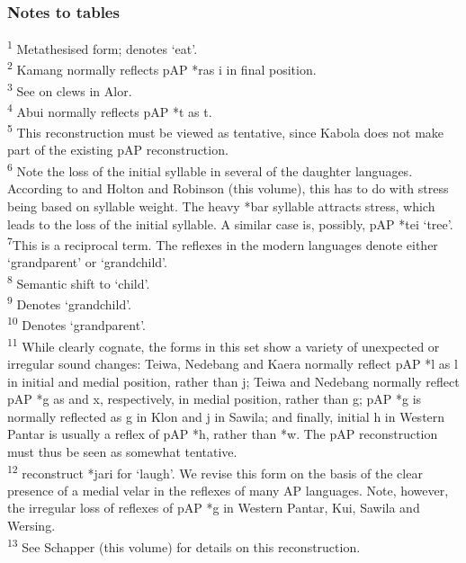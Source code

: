 \documentclass[output=paper]{LSP/langsci}
\begin{document}
\subsubsection{Notes to tables}
\noindent
\textsuperscript{1} Metathesised form; denotes ‘eat’. 
\\
\textsuperscript{2} Kamang normally reflects pAP *ras i in final position. 
\\
\textsuperscript{3} See \citet{Rodemeier1992} on clews in Alor. 
\\
\textsuperscript{4} Abui normally reflects pAP *t as t. 
\\
\textsuperscript{5} This reconstruction must be viewed as tentative, since Kabola does not make part of the existing pAP reconstruction.
\\
\textsuperscript{6} Note the loss of the initial syllable in several of the daughter languages. According to \citet{HoltonEtAl2012} and Holton and Robinson (this volume), this has to do with stress being based on syllable weight. The heavy *bar syllable attracts stress, which leads to the loss of the initial syllable. A similar case is, possibly, pAP *tei ‘tree’.
\\
\textsuperscript{7}This is a reciprocal term. The reflexes in the modern languages denote either `grandparent' or `grandchild'. 
\\
\textsuperscript{8} Semantic shift to `child'. 
\\ 
\textsuperscript{9} Denotes `grandchild'. 
\\ 
\textsuperscript{10} Denotes `grandparent'. 
\\ 
\textsuperscript{11} While clearly cognate, the forms in this set show a variety of unexpected or irregular sound changes: Teiwa, Nedebang and Kaera normally reflect pAP *l as l in initial and medial position, rather than j; Teiwa and Nedebang normally reflect pAP *g as {\pharfric} and x, respectively, in medial position, rather than g; pAP *g is normally reflected as g in Klon and j in Sawila; and finally, initial h in Western Pantar is usually a reflex of pAP *h, rather than *w. The pAP reconstruction must thus be seen as somewhat tentative.
 \\
\textsuperscript{12} \citet{HoltonEtAl2012} reconstruct *jari for `laugh'. We revise this form on the basis of the clear presence of a medial velar in the reflexes of many AP languages. Note, however, the irregular loss of reflexes of pAP *g in Western Pantar, Kui, Sawila and Wersing. 
 \\
\textsuperscript{13} See Schapper (this volume) for details on this reconstruction. 
\end{document}
